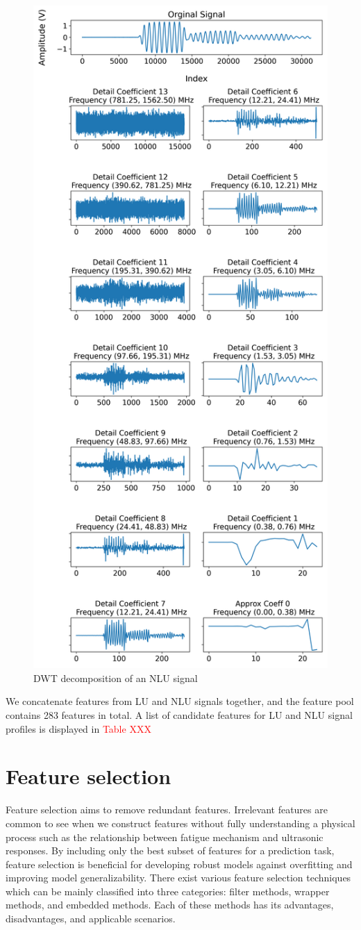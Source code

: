 \begin{figure}[tb]
    \centering
    \includegraphics[height=\linewidth]{fig/dwt_decomposition.png}
    \caption{DWT decomposition of an NLU signal}
    \label{fig: dwt decomposition}
\end{figure}

We concatenate features from LU and NLU signals together, and the feature pool contains 283 features in total. A list of candidate features for LU and NLU signal profiles is displayed in \textcolor{red}{Table XXX}

\section{Feature selection}
Feature selection aims to remove redundant features. Irrelevant features are common to see when we construct features without fully understanding a physical process such as the relationship between fatigue mechanism and ultrasonic responses. By including only the best subset of features for a prediction task, feature selection is beneficial for developing robust models against overfitting and improving model generalizability. There exist various feature selection techniques which can be mainly classified into three categories: filter methods, wrapper methods, and embedded methods. Each of these methods has its advantages, disadvantages, and applicable scenarios.

